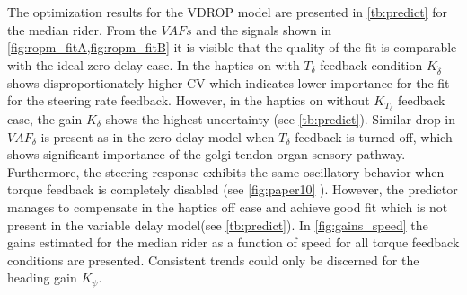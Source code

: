 The optimization results for the VDROP model are presented in \cref{tb:predict} for the median rider. From the \ensuremath{\mathit{VAF}s} and the signals shown in \cref{fig:ropm_fitA,fig:ropm_fitB} it is visible that the quality of the fit is comparable with the ideal zero delay case. In the haptics on with \ensuremath{{T_\delta}} feedback condition \ensuremath{K_{\dot{\delta}}} shows disproportionately higher CV which indicates lower importance for the fit for the steering rate feedback. However, in the haptics on without \ensuremath{K_{T_\delta}} feedback case, the gain \ensuremath{K_{\delta}} shows the highest  uncertainty (see \cref{tb:predict}). Similar drop in \ensuremath{\mathit{VAF}_\delta} is present as in the zero delay model when  \ensuremath{{T_\delta}} feedback is turned off, which shows significant importance of the golgi tendon organ sensory pathway. Furthermore, the steering response exhibits  the same oscillatory behavior when torque feedback is completely disabled (see \cref{fig:paper10} ). However, the predictor manages to compensate in the haptics off case and achieve good fit which is not present in the variable delay model(see \cref{tb:predict}). In \cref{fig:gains_speed} the gains estimated for the median rider as a function of speed for all torque feedback conditions are presented. Consistent trends could only be discerned for the heading  gain \ensuremath{K_\psi}.

